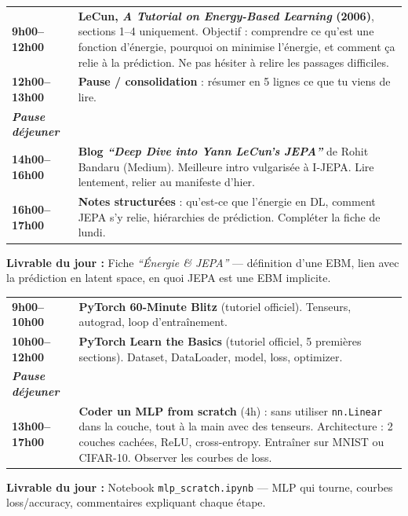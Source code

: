 \documentclass[a4paper,11pt]{article}
\begin{document}
\vspace{0.5cm}

\begin{tcolorbox}[daybox, title={Mardi — Energy-Based Learning + Blog (7h)}]
\renewcommand{\arraystretch}{1.4}
\begin{tabularx}{\textwidth}{>{\bfseries\color{jepaBlue}}p{2.2cm} X}
  9h00–12h00  & \textbf{LeCun, \textit{A Tutorial on Energy-Based Learning} (2006)}, sections 1–4 uniquement. Objectif : comprendre ce qu'est une fonction d'énergie, pourquoi on minimise l'énergie, et comment ça relie à la prédiction. Ne pas hésiter à relire les passages difficiles. \\
  12h00–13h00 & \textbf{Pause / consolidation} : résumer en 5 lignes ce que tu viens de lire. \\
  \textit{Pause déjeuner} & \\
  14h00–16h00 & \textbf{Blog \textit{``Deep Dive into Yann LeCun's JEPA''}} de Rohit Bandaru (Medium). Meilleure intro vulgarisée à I-JEPA. Lire lentement, relier au manifeste d'hier. \\
  16h00–17h00 & \textbf{Notes structurées} : qu'est-ce que l'énergie en DL, comment JEPA s'y relie, hiérarchies de prédiction. Compléter la fiche de lundi. \\
\end{tabularx}

\vspace{0.3cm}
\textbf{\color{successGreen} Livrable du jour :} Fiche \textit{``Énergie \& JEPA''} — définition d'une EBM, lien avec la prédiction en latent space, en quoi JEPA est une EBM implicite.
\end{tcolorbox}

\vspace{0.5cm}

\begin{tcolorbox}[daybox, title={Mercredi — PyTorch : bases + MLP from scratch (7h)}]
\renewcommand{\arraystretch}{1.4}
\begin{tabularx}{\textwidth}{>{\bfseries\color{jepaBlue}}p{2.2cm} X}
  9h00–10h00  & \textbf{PyTorch 60-Minute Blitz} (tutoriel officiel). Tenseurs, autograd, loop d'entraînement. \\
  10h00–12h00 & \textbf{PyTorch Learn the Basics} (tutoriel officiel, 5 premières sections). Dataset, DataLoader, model, loss, optimizer. \\
  \textit{Pause déjeuner} & \\
  13h00–17h00 & \textbf{Coder un MLP from scratch} (4h) : sans utiliser \texttt{nn.Linear} dans la couche, tout à la main avec des tenseurs. Architecture : 2 couches cachées, ReLU, cross-entropy. Entraîner sur MNIST ou CIFAR-10. Observer les courbes de loss. \\
\end{tabularx}

\vspace{0.3cm}
\textbf{\color{successGreen} Livrable du jour :} Notebook \texttt{mlp\_scratch.ipynb} — MLP qui tourne, courbes loss/accuracy, commentaires expliquant chaque étape.
\end{tcolorbox}
\end{document}
